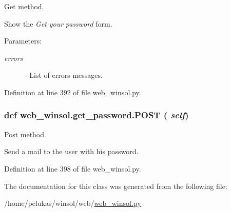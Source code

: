 Get method. 

Show the {\em Get\/} {\em your\/} {\em password\/} form.

\begin{Desc}
\item[Parameters:]
\begin{description}
\item[{\em errors}]- List of errors messages. \end{description}
\end{Desc}


Definition at line 392 of file web\_\-winsol.py.\hypertarget{classweb__winsol_1_1get__password_83680c23995a30d5d428c8e7a7d89862}{
\subsubsection[POST]{\setlength{\rightskip}{0pt plus 5cm}def web\_\-winsol.get\_\-password.POST ( {\em self})}}
\label{classweb__winsol_1_1get__password_83680c23995a30d5d428c8e7a7d89862}


Post method. 

Send a mail to the user with his password. 

Definition at line 398 of file web\_\-winsol.py.

The documentation for this class was generated from the following file:\begin{CompactItemize}
\item 
/home/pelukas/winsol/web/\hyperlink{web__winsol_8py}{web\_\-winsol.py}\end{CompactItemize}
